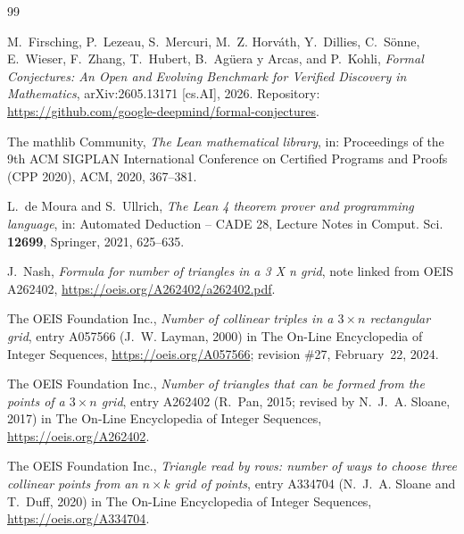 \documentclass[11pt]{amsart}
\theoremstyle{plain}
\theoremstyle{definition}
\begin{document}
{\small
\begin{thebibliography}{99}

M.~Firsching, P.~Lezeau, S.~Mercuri, M.~Z. Horv\'ath, Y.~Dillies, C.~S\"onne, E.~Wieser, F.~Zhang, T.~Hubert, B.~Ag\"uera y Arcas, and P.~Kohli, \emph{Formal Conjectures: An Open and Evolving Benchmark for Verified Discovery in Mathematics}, arXiv:2605.13171 [cs.AI], 2026. Repository: \url{https://github.com/google-deepmind/formal-conjectures}.

The mathlib Community, \emph{The Lean mathematical library}, in: Proceedings of the 9th ACM SIGPLAN International Conference on Certified Programs and Proofs (CPP 2020), ACM, 2020, 367--381.

L.~de Moura and S.~Ullrich, \emph{The Lean 4 theorem prover and programming language}, in: Automated Deduction -- CADE 28, Lecture Notes in Comput. Sci. \textbf{12699}, Springer, 2021, 625--635.

J.~Nash, \emph{Formula for number of triangles in a 3 X n grid}, note linked from OEIS A262402, \url{https://oeis.org/A262402/a262402.pdf}.

The OEIS Foundation Inc., \emph{Number of collinear triples in a $3\times n$ rectangular grid}, entry A057566 (J.~W. Layman, 2000) in The On-Line Encyclopedia of Integer Sequences, \url{https://oeis.org/A057566}; revision \#27, February~22, 2024.

The OEIS Foundation Inc., \emph{Number of triangles that can be formed from the points of a $3\times n$ grid}, entry A262402 (R.~Pan, 2015; revised by N.~J.~A. Sloane, 2017) in The On-Line Encyclopedia of Integer Sequences, \url{https://oeis.org/A262402}.

The OEIS Foundation Inc., \emph{Triangle read by rows: number of ways to choose three collinear points from an $n\times k$ grid of points}, entry A334704 (N.~J.~A. Sloane and T.~Duff, 2020) in The On-Line Encyclopedia of Integer Sequences, \url{https://oeis.org/A334704}.

\end{thebibliography}
}
\end{document}
